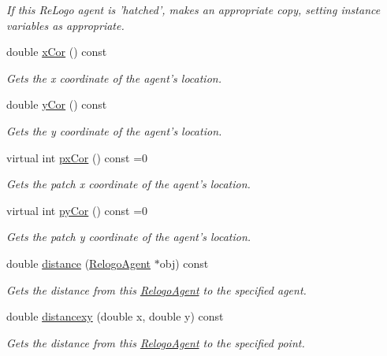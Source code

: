 \begin{DoxyCompactItemize}
\begin{DoxyCompactList}\small\item\em If this Re\-Logo agent is 'hatched', makes an appropriate copy, setting instance variables as appropriate. \end{DoxyCompactList}\item 
double \hyperlink{classrepast_1_1relogo_1_1_relogo_agent_ad741eb80eea72c025089fc641cd6f9a5}{x\-Cor} () const 
\begin{DoxyCompactList}\small\item\em Gets the x coordinate of the agent's location. \end{DoxyCompactList}\item 
double \hyperlink{classrepast_1_1relogo_1_1_relogo_agent_ae9cff89b06acffb461a391ab4bd13206}{y\-Cor} () const 
\begin{DoxyCompactList}\small\item\em Gets the y coordinate of the agent's location. \end{DoxyCompactList}\item 
virtual int \hyperlink{classrepast_1_1relogo_1_1_relogo_agent_a8219a12f66709b4c86c547668235eda9}{px\-Cor} () const =0
\begin{DoxyCompactList}\small\item\em Gets the patch x coordinate of the agent's location. \end{DoxyCompactList}\item 
virtual int \hyperlink{classrepast_1_1relogo_1_1_relogo_agent_a4cf0eae31dc04149160dfd7b77044158}{py\-Cor} () const =0
\begin{DoxyCompactList}\small\item\em Gets the patch y coordinate of the agent's location. \end{DoxyCompactList}\item 
double \hyperlink{classrepast_1_1relogo_1_1_relogo_agent_a12a186ace28dcebf62faa6d3441f8a78}{distance} (\hyperlink{classrepast_1_1relogo_1_1_relogo_agent}{Relogo\-Agent} $\ast$obj) const 
\begin{DoxyCompactList}\small\item\em Gets the distance from this \hyperlink{classrepast_1_1relogo_1_1_relogo_agent}{Relogo\-Agent} to the specified agent. \end{DoxyCompactList}\item 
double \hyperlink{classrepast_1_1relogo_1_1_relogo_agent_a99dc8c0452c0fb699f7e807224e41d64}{distancexy} (double x, double y) const 
\begin{DoxyCompactList}\small\item\em Gets the distance from this \hyperlink{classrepast_1_1relogo_1_1_relogo_agent}{Relogo\-Agent} to the specified point. \end{DoxyCompactList}\end{DoxyCompactItemize}
